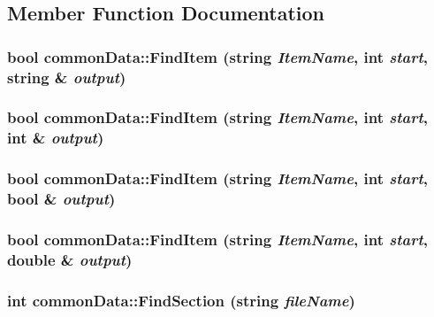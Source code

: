 \subsection{Member Function Documentation}
\hypertarget{classcommon_data_aee279b2c8519ac55eed8942a8b9f028f}{
\subsubsection[{FindItem}]{\setlength{\rightskip}{0pt plus 5cm}bool commonData::FindItem (string {\em ItemName}, \/  int {\em start}, \/  string \& {\em output})}}
\label{classcommon_data_aee279b2c8519ac55eed8942a8b9f028f}
\hypertarget{classcommon_data_a9890851d4ca83d9290d793a5dbb8fdab}{
\subsubsection[{FindItem}]{\setlength{\rightskip}{0pt plus 5cm}bool commonData::FindItem (string {\em ItemName}, \/  int {\em start}, \/  int \& {\em output})}}
\label{classcommon_data_a9890851d4ca83d9290d793a5dbb8fdab}
\hypertarget{classcommon_data_a46254c46ab80006b173b6e1c85790842}{
\subsubsection[{FindItem}]{\setlength{\rightskip}{0pt plus 5cm}bool commonData::FindItem (string {\em ItemName}, \/  int {\em start}, \/  bool \& {\em output})}}
\label{classcommon_data_a46254c46ab80006b173b6e1c85790842}
\hypertarget{classcommon_data_a93c4b682fc807b027c7f382af5c7a456}{
\subsubsection[{FindItem}]{\setlength{\rightskip}{0pt plus 5cm}bool commonData::FindItem (string {\em ItemName}, \/  int {\em start}, \/  double \& {\em output})}}
\label{classcommon_data_a93c4b682fc807b027c7f382af5c7a456}
\hypertarget{classcommon_data_aa4d72251ad8be8a2b7f67ded16543844}{
\subsubsection[{FindSection}]{\setlength{\rightskip}{0pt plus 5cm}int commonData::FindSection (string {\em fileName})}}
